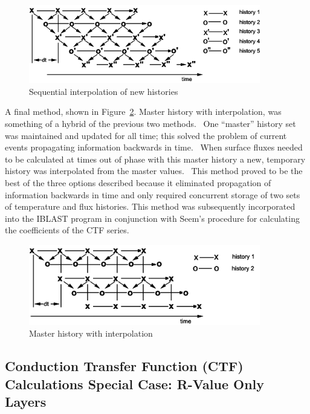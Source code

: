 \begin{figure}[hbtp] %
\centering
\includegraphics[width=0.9\textwidth, height=0.9\textheight, keepaspectratio=true]{media/image170.svg.png}
\caption{Sequential interpolation of new histories \protect \label{fig:sequential-interpolation-of-new-histories}}
\end{figure}

A final method, shown in Figure~\ref{fig:master-history-with-interpolation}. Master history with interpolation, was something of a hybrid of the previous two methods.~ One ``master'' history set was maintained and updated for all time; this solved the problem of current events propagating information backwards in time.~ When surface fluxes needed to be calculated at times out of phase with this master history a new, temporary history was interpolated from the master values.~ This method proved to be the best of the three options described because it eliminated propagation of information backwards in time and only required concurrent storage of two sets of temperature and flux histories. This method was subsequently incorporated into the IBLAST program in conjunction with Seem's procedure for calculating the coefficients of the CTF series.

\begin{figure}[hbtp] %
\centering
\includegraphics[width=0.9\textwidth, height=0.9\textheight, keepaspectratio=true]{media/image171.svg.png}
\caption{Master history with interpolation \protect \label{fig:master-history-with-interpolation}}
\end{figure}

\subsection{Conduction Transfer Function (CTF) Calculations Special Case: R-Value Only Layers}\label{conduction-transfer-function-ctf-calculations-special-case-r-value-only-layers}

